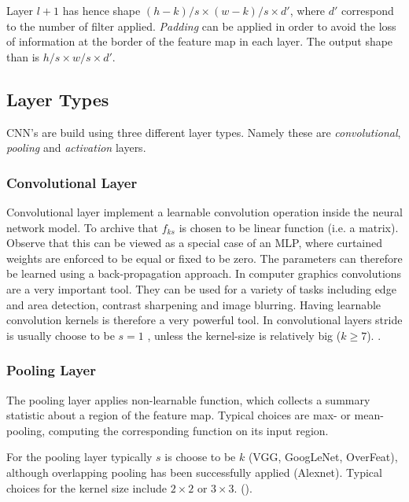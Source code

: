 Layer $l+1$ has hence shape $(h - k)/s \times (w-k)/s \times d'$, where $d'$ correspond to the number of filter applied. \emph{Padding} can be applied in order to avoid the loss of information at the border of the feature map in each layer. The output shape than is $h/s \times w/s \times d'$.

\subsection{Layer Types}

CNN's are build using three different layer types. Namely these are \emph{convolutional}, \emph{pooling} and \emph{activation} layers.

\subsubsection{Convolutional Layer}

Convolutional layer implement a learnable convolution operation inside the neural network model. To archive that $f_{ks}$ is chosen to be linear function (i.e. a matrix). Observe that this can be viewed as a special case of an MLP, where curtained weights are enforced to be equal or fixed to be zero. The parameters can therefore be learned using a back-propagation approach. In computer graphics convolutions are a very important tool. They can be used for a variety of tasks including edge and area detection, contrast sharpening and image blurring. Having learnable convolution kernels is therefore a very powerful tool. In convolutional layers stride is usually choose to be $s=1$ , unless the kernel-size is relatively big ($k \geq 7$).  \cite{AlexNet,VGG16,googLeNeT}. 


 
 \subsubsection{Pooling Layer}

The pooling layer applies non-learnable function, which collects a summary statistic about a region of the feature map. Typical choices are max- or mean-pooling, computing the corresponding function on its input region. 

For the pooling layer typically $s$ is choose to be $k$ (VGG, GoogLeNet, OverFeat),  although overlapping pooling has been successfully applied (Alexnet). Typical choices for the kernel size include $2 \times 2$ or $3 \times 3$. (\cite{AlexNet,VGG16,googLeNeT}).

